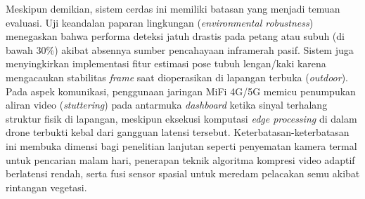 Meskipun demikian, sistem cerdas ini memiliki batasan yang menjadi temuan evaluasi. Uji keandalan paparan lingkungan (\textit{environmental robustness}) menegaskan bahwa performa deteksi jatuh drastis pada petang atau subuh (di bawah 30\%) akibat absennya sumber pencahayaan inframerah pasif. Sistem juga menyingkirkan implementasi fitur estimasi pose tubuh lengan/kaki karena mengacaukan stabilitas \textit{frame} saat dioperasikan di lapangan terbuka (\textit{outdoor}). Pada aspek komunikasi, penggunaan jaringan MiFi 4G/5G memicu penumpukan aliran video (\textit{stuttering}) pada antarmuka \textit{dashboard} ketika sinyal terhalang struktur fisik di lapangan, meskipun eksekusi komputasi \textit{edge processing} di dalam drone terbukti kebal dari gangguan latensi tersebut. Keterbatasan-keterbatasan ini membuka dimensi bagi penelitian lanjutan seperti penyematan kamera termal untuk pencarian malam hari, penerapan teknik algoritma kompresi video adaptif berlatensi rendah, serta fusi sensor spasial untuk meredam pelacakan semu akibat rintangan vegetasi.